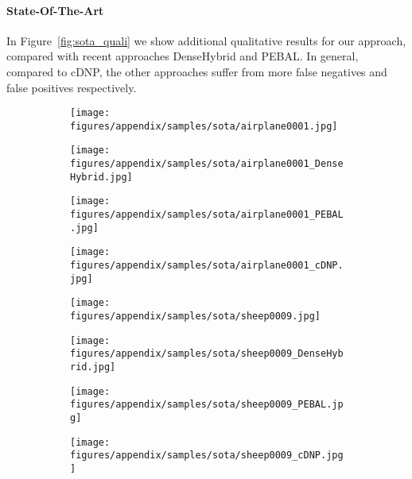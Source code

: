 \documentclass[10pt,twocolumn,letterpaper]{article}
\begin{document}
\paragraph{State-Of-The-Art}
In Figure~\ref{fig:sota_quali} we show additional qualitative results for our approach, compared with recent approaches DenseHybrid and PEBAL.
In general, compared to cDNP, the other approaches suffer from more false negatives and false positives respectively.
\begin{figure}[h!]
    \centering
    \begin{subfigure}[b]{0.110\textwidth}
        \centering
        \texttt{[image: figures/appendix/samples/sota/airplane0001.jpg]}
    \end{subfigure}
    \begin{subfigure}[b]{0.110\textwidth}
        \centering
        \texttt{[image: figures/appendix/samples/sota/airplane0001\_DenseHybrid.jpg]}
    \end{subfigure}
    \begin{subfigure}[b]{0.110\textwidth}
        \centering
        \texttt{[image: figures/appendix/samples/sota/airplane0001\_PEBAL.jpg]}
    \end{subfigure}
    \begin{subfigure}[b]{0.110\textwidth}
        \centering
        \texttt{[image: figures/appendix/samples/sota/airplane0001\_cDNP.jpg]}
    \end{subfigure}
    
    \begin{subfigure}[b]{0.110\textwidth}
        \centering
        \texttt{[image: figures/appendix/samples/sota/sheep0009.jpg]}
    \end{subfigure}
    \begin{subfigure}[b]{0.110\textwidth}
        \centering
        \texttt{[image: figures/appendix/samples/sota/sheep0009\_DenseHybrid.jpg]}
    \end{subfigure}
    \begin{subfigure}[b]{0.110\textwidth}
        \centering
        \texttt{[image: figures/appendix/samples/sota/sheep0009\_PEBAL.jpg]}
    \end{subfigure}
    \begin{subfigure}[b]{0.110\textwidth}
        \centering
        \texttt{[image: figures/appendix/samples/sota/sheep0009\_cDNP.jpg]}
    \end{subfigure}
    

\end{figure}
\end{document}
